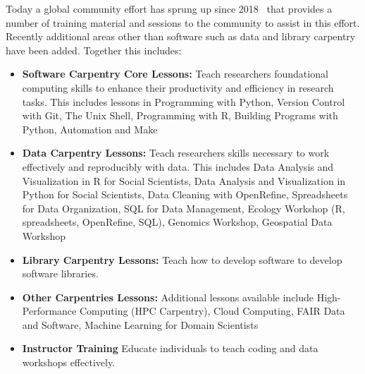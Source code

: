 Today a global community effort has sprung up since 2018~\cite{softwarecarpentry2024} that provides a number of training material and sessions to the community to assist in this effort.
Recently additional areas other than software such as data and library carpentry have been added.
Together this includes:

\begin{itemize}
  \item \textbf{Software Carpentry Core Lessons:} 
 Teach researchers foundational computing skills to enhance their productivity and efficiency in research tasks. This includes lessons in 
  Programming with Python, Version Control with Git, The Unix Shell, Programming with R, Building Programs with Python, Automation and Make

  \item \textbf{Data Carpentry Lessons:}
  Teach researchers skills necessary to work effectively and reproducibly with data. This includes
  Data Analysis and Visualization in R for Social Scientists, Data Analysis and Visualization in Python for Social Scientists, Data Cleaning with OpenRefine, Spreadsheets for Data Organization, SQL for Data Management, Ecology Workshop (R, spreadsheets, OpenRefine, SQL), Genomics Workshop, Geospatial Data Workshop

  \item \textbf{Library Carpentry Lessons:}
  Teach how to develop software to develop software libraries.
  
  \item \textbf{Other Carpentries Lessons:}
   Additional lessons available include High-Performance Computing (HPC Carpentry), Cloud Computing, FAIR Data and Software, Machine Learning for Domain Scientists
  
  \item \textbf{Instructor Training} Educate individuals to teach coding and data workshops effectively.
\end{itemize}
